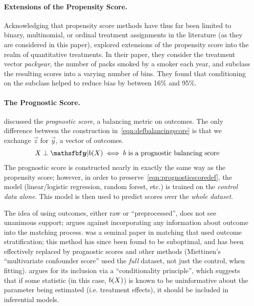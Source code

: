 \documentclass[11pt]{extarticle}
\begin{document}
\paragraph{Extensions of the Propensity Score.} Acknowledging that propensity score methods have thus far been limited to binary, multinomial, or ordinal treatment assignments in the literature (as they are considered in this paper), \textcite{imai_causal_2004} explored extensions of the propensity score into the realm of quantitative treatments. In their paper, they consider the treatment vector \emph{packyear}, the number of packs smoked by a smoker each year, and subclass the resulting scores into a varying number of bins. They found that conditioning on the subclass helped to reduce bias by between 16\% and 95\%.

\paragraph{The Prognostic Score.} \textcite{hansen_prognostic_2008} discussed the \emph{prognostic score}, a balancing metric on outcomes. The only difference between the construction in~\eqref{eqn:defbalancingscore} is that we exchange $\vec{z}$ for $\vec{y}$, a vector of outcomes.
\begin{equation}
  \mat{X} \perp \vec{y} | b(\mat{X}) \iff b \text{ is a prognostic balancing score} \label{eqn:prognosticscoredef}
\end{equation}
The prognostic score is constructed nearly in exactly the same way as the propensity score; however, in order to preserve~\eqref{eqn:prognosticscoredef}, the model (linear/logistic regression, random forest, etc.) is trained on the \emph{control data alone}. This model is then used to predict scores over the \emph{whole dataset}.

The idea of using outcomes, either raw or ``preprocessed'', does not see unanimous support; \textcite{garrido_methods_2014} argues against incorporating any information about outcome into the matching process. \textcite{miettinen_stratification_1976} was a seminal paper in matching that used outcome stratification; this method has since been found to be suboptimal, and has been effectively replaced by prognostic scores and other methods \parencite{hansen_bias_2006} (Miettinen's ``multivariate confounder score'' used the \emph{full} dataset, not just the control, when fitting). \textcite{hansen_bias_2006} argues for its inclusion via a ``conditionality principle'', which suggests that if some statistic (in this case, $b(X)$) is known to be uninformative about the parameter being estimated (i.e. treatment effects), it should be included in inferential models.
\end{document}

